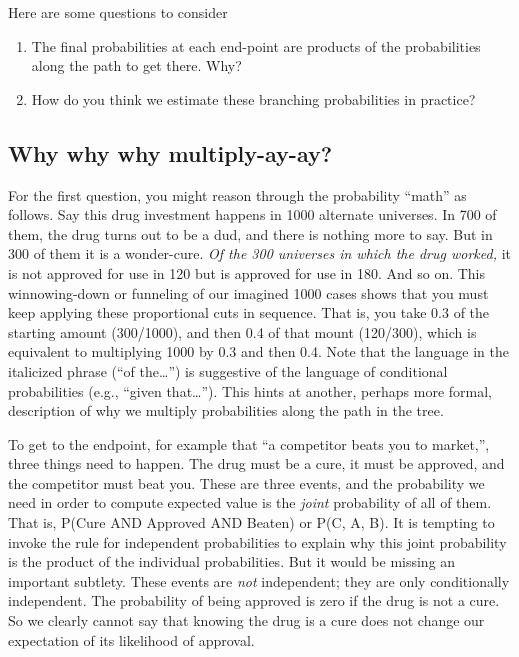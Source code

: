 \documentclass[
  openany]{book}
\providecommand{\tightlist}{%
  \setlength{\itemsep}{0pt}\setlength{\parskip}{0pt}}
\begin{document}
Here are some questions to consider

\begin{enumerate}
\def\labelenumi{\arabic{enumi}.}
\tightlist
\item
  The final probabilities at each end-point are products of the probabilities along the path to get there. Why?
\item
  How do you think we estimate these branching probabilities in practice?
\end{enumerate}

\hypertarget{why-why-why-multiply-ay-ay}{%
\subsection*{Why why why multiply-ay-ay?}\label{why-why-why-multiply-ay-ay}}

For the first question, you might reason through the probability ``math'' as follows. Say this drug investment happens in 1000 alternate universes. In 700 of them, the drug turns out to be a dud, and there is nothing more to say. But in 300 of them it is a wonder-cure. \emph{Of the 300 universes in which the drug worked,} it is not approved for use in 120 but is approved for use in 180. And so on. This winnowing-down or funneling of our imagined 1000 cases shows that you must keep applying these proportional cuts in sequence. That is, you take 0.3 of the starting amount (300/1000), and then 0.4 of that mount (120/300), which is equivalent to multiplying 1000 by 0.3 and then 0.4. Note that the language in the italicized phrase (``of the\ldots{}'') is suggestive of the language of conditional probabilities (e.g., ``given that\ldots{}''). This hints at another, perhaps more formal, description of why we multiply probabilities along the path in the tree.

To get to the endpoint, for example that ``a competitor beats you to market,'', three things need to happen. The drug must be a cure, it must be approved, and the competitor must beat you. These are three events, and the probability we need in order to compute expected value is the \emph{joint} probability of all of them. That is, P(Cure AND Approved AND Beaten) or P(C, A, B). It is tempting to invoke the rule for independent probabilities to explain why this joint probability is the product of the individual probabilities. But it would be missing an important subtlety. These events are \emph{not} independent; they are only conditionally independent. The probability of being approved is zero if the drug is not a cure. So we clearly cannot say that knowing the drug is a cure does not change our expectation of its likelihood of approval.
\end{document}
